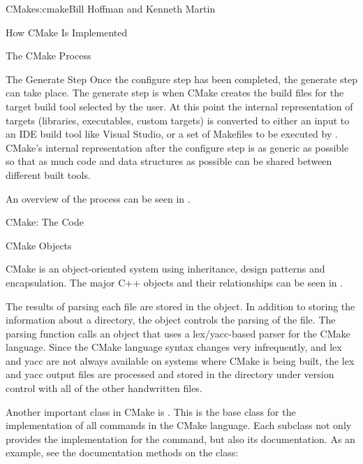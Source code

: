 \begin{aosachapter}{CMake}{s:cmake}{Bill Hoffman and Kenneth Martin}
\begin{aosasect1}{How CMake Is Implemented}
\begin{aosasect2}{The CMake Process}
\begin{aosasect3}{The Generate Step}
Once the configure step has been completed, the generate step can take
place. The generate step is when CMake creates the build files for the
target build tool selected by the user. At this point the internal
representation of targets (libraries, executables, custom targets) is
converted to either an input to an IDE build tool like Visual Studio,
or a set of Makefiles to be executed by . CMake's internal
representation after the configure step is as generic as possible so
that as much code and data structures as possible can be shared
between different built tools.

An overview of the process can be seen in .


\end{aosasect3}

\end{aosasect2}

\begin{aosasect2}{CMake: The Code}

\begin{aosasect3}{CMake Objects}

CMake is an object-oriented system using inheritance, design patterns
and encapsulation.  The major C++ objects and their relationships can
be seen in .


The results of parsing each  file are stored in
the  object. In addition to storing the information
about a directory, the  object controls the parsing
of the  file. The parsing function calls an
object that uses a lex/yacc-based parser for the CMake language.
Since the CMake language syntax changes very infrequently, and lex and yacc
are not always available on systems where CMake is being built, the
lex and yacc output files are processed and stored in the
 directory under version control with all of the other
handwritten files.

Another important class in CMake is . This is the base
class for the implementation of all commands in the CMake
language. Each subclass not only provides the implementation for the
command, but also its documentation. As an example, see the
documentation methods on the  class:


\end{aosasect3}
\end{aosasect2}
\end{aosasect1}
\end{aosachapter}
